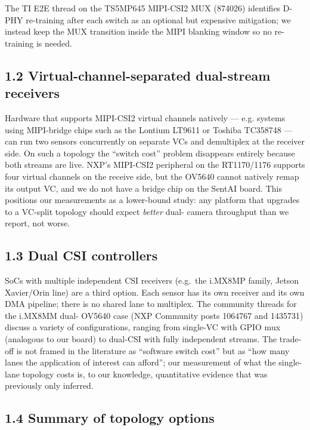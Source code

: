 The TI E2E thread on the TS5MP645 MIPI-CSI2 MUX (874026) identifies
D-PHY re-training after each switch as an optional but expensive
mitigation; we instead keep the MUX transition inside the MIPI blanking
window so no re-training is needed.

\subsection{1.2 Virtual-channel-separated dual-stream
receivers}\label{virtual-channel-separated-dual-stream-receivers}

Hardware that supports MIPI-CSI2 virtual channels natively --- e.g.
systems using MIPI-bridge chips such as the Lontium LT9611 or Toshiba
TC358748 --- can run two sensors concurrently on separate VCs and
demultiplex at the receiver side. On such a topology the ``switch cost''
problem disappears entirely because both streams are live. NXP's
MIPI-CSI2 peripheral on the RT1170/1176 supports four virtual channels
on the receive side, but the OV5640 cannot natively remap its output VC,
and we do not have a bridge chip on the SentAI board. This positions our
measurements as a lower-bound study: any platform that upgrades to a
VC-split topology should expect \emph{better} dual- camera throughput
than we report, not worse.

\subsection{1.3 Dual CSI controllers}\label{dual-csi-controllers}

SoCs with multiple independent CSI receivers (e.g.~the i.MX8MP family,
Jetson Xavier/Orin line) are a third option. Each sensor has its own
receiver and its own DMA pipeline; there is no shared lane to multiplex.
The community threads for the i.MX8MM dual- OV5640 case (NXP Community
posts 1064767 and 1435731) discuss a variety of configurations, ranging
from single-VC with GPIO mux (analogous to our board) to dual-CSI with
fully independent streams. The trade-off is not framed in the literature
as ``software switch cost'' but as ``how many lanes the application of
interest can afford''; our measurement of what the single-lane topology
costs is, to our knowledge, quantitative evidence that was previously
only inferred.

\subsection{1.4 Summary of topology
options}\label{summary-of-topology-options}

